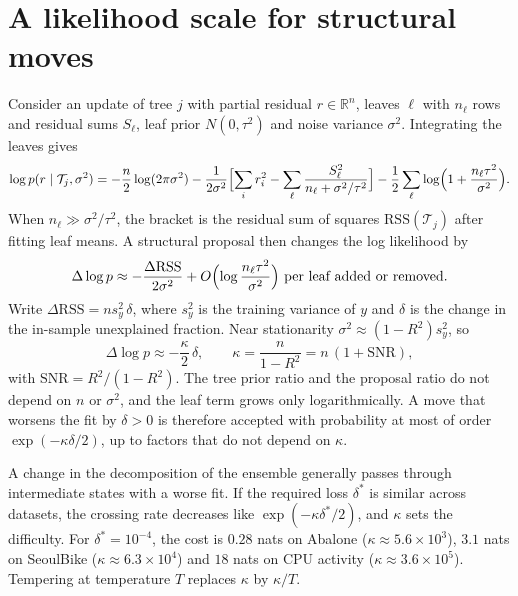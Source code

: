 \documentclass[11pt]{article}
\newcommand{\zhfont}{}
\begin{document}
\section{A likelihood scale for structural moves\quad{\zhfont 结构移动的似然尺度}}
\label{sec:scale}
Consider an update of tree $j$ with partial residual $r\in\mathbb R^n$, leaves $\ell$ with $n_\ell$ rows and residual sums $S_\ell$, leaf prior $N(0,\tau^2)$ and noise variance $\sigma^2$. Integrating the leaves gives
\begin{equation}
\log p(r\mid\mathcal T_j,\sigma^2) = -\frac{n}{2}\log(2\pi\sigma^2) - \frac{1}{2\sigma^2}\Bigl[\sum_i r_i^2 - \sum_\ell \frac{S_\ell^2}{n_\ell+\sigma^2/\tau^2}\Bigr] - \frac12\sum_\ell \log\Bigl(1+\frac{n_\ell\tau^2}{\sigma^2}\Bigr).
\label{eq:collapsed}
\end{equation}
When $n_\ell\gg\sigma^2/\tau^2$, the bracket is the residual sum of squares $\mathrm{RSS}(\mathcal T_j)$ after fitting leaf means. A structural proposal then changes the log likelihood by
\begin{equation}
\Delta\log p \approx -\frac{\Delta\mathrm{RSS}}{2\sigma^2} + O\Bigl(\log\frac{n_\ell\tau^2}{\sigma^2}\Bigr)\ \text{per leaf added or removed}.
\end{equation}
Write $\Delta\mathrm{RSS}=n s_y^2\,\delta$, where $s_y^2$ is the training variance of $y$ and $\delta$ is the change in the in-sample unexplained fraction. Near stationarity $\sigma^2\approx(1-R^2)s_y^2$, so
\begin{equation}
\Delta\log p \approx -\frac{\kappa}{2}\,\delta,\qquad \kappa=\frac{n}{1-R^2}=n\,(1+\mathrm{SNR}),
\label{eq:kappa}
\end{equation}
with $\mathrm{SNR}=R^2/(1-R^2)$. The tree prior ratio and the proposal ratio do not depend on $n$ or $\sigma^2$, and the leaf term grows only logarithmically. A move that worsens the fit by $\delta>0$ is therefore accepted with probability at most of order $\exp(-\kappa\delta/2)$, up to factors that do not depend on $\kappa$.

A change in the decomposition of the ensemble generally passes through intermediate states with a worse fit. If the required loss $\delta^\ast$ is similar across datasets, the crossing rate decreases like $\exp(-\kappa\delta^\ast/2)$, and $\kappa$ sets the difficulty. For $\delta^\ast=10^{-4}$, the cost is $0.28$ nats on Abalone ($\kappa\approx5.6\times10^3$), $3.1$ nats on SeoulBike ($\kappa\approx6.3\times10^4$) and $18$ nats on CPU activity ($\kappa\approx3.6\times10^5$). Tempering at temperature $T$ replaces $\kappa$ by $\kappa/T$.
\end{document}
